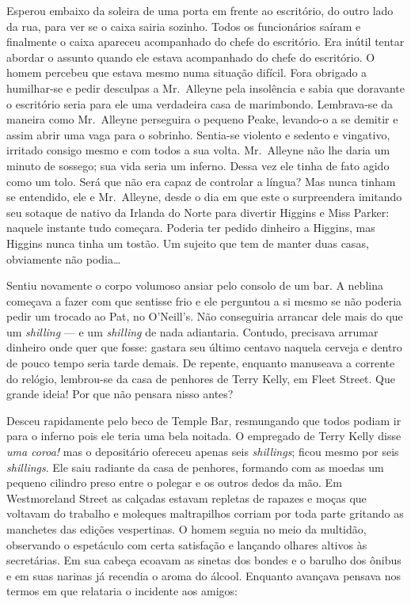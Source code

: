 \smallskip

Esperou embaixo da soleira de uma porta em frente ao escritório, do outro lado
da rua, para ver se o caixa sairia sozinho.  Todos os funcionários saíram e
finalmente o caixa apareceu acompanhado do chefe do escritório.  Era inútil
tentar abordar o assunto quando ele estava acompanhado do chefe do escritório.
O homem percebeu que estava mesmo numa situação difícil.  Fora obrigado a
humilhar-se e pedir desculpas a Mr.~Alleyne pela insolência e sabia que
doravante o escritório seria para ele uma verdadeira casa de marimbondo.
Lembrava-se da maneira como Mr.~Alleyne perseguira o pequeno Peake, levando-o a
se demitir e assim abrir uma vaga para o sobrinho.  Sentia-se violento e
sedento e vingativo, irritado consigo mesmo e com todos a sua volta.  
Mr.~Alleyne não lhe daria um minuto de sossego; sua vida seria um inferno.  Dessa
vez ele tinha de fato agido como um tolo.  Será que não era capaz de controlar
a língua?  Mas nunca tinham se entendido, ele e Mr.~Alleyne, desde o dia em que
este o surpreendera imitando seu sotaque de nativo da Irlanda do Norte para
divertir Higgins e Miss Parker: naquele instante tudo começara.  Poderia ter
pedido dinheiro a Higgins, mas Higgins nunca tinha um tostão.  Um sujeito que
tem de manter duas casas, obviamente não podia\ldots{}

Sentiu novamente o corpo volumoso ansiar pelo consolo de um bar.  A neblina
começava a fazer com que sentisse frio e ele perguntou a si mesmo se não
poderia pedir um trocado ao Pat, no O’Neill’s.  Não conseguiria arrancar dele
mais do que um \textit{shilling} --- e um \textit{shilling} de nada
adiantaria.  Contudo, precisava arrumar dinheiro onde quer que fosse: gastara
seu último centavo naquela cerveja e dentro de pouco tempo seria tarde demais.
De repente, enquanto manuseava a corrente do relógio, lembrou-se da casa de
penhores de Terry Kelly, em Fleet Street.  Que grande ideia!  Por que não
pensara nisso antes?

Desceu rapidamente pelo beco de Temple Bar, resmungando que todos podiam ir
para o inferno pois ele teria uma bela noitada.  O empregado de Terry Kelly
disse \textit{uma coroa!} mas o depositário ofereceu apenas seis
\textit{shillings}; ficou mesmo por seis \textit{shillings}.  Ele saiu radiante
da casa de penhores, formando com as moedas um pequeno cilindro preso entre o
polegar e os outros dedos da mão.  Em Westmoreland Street as calçadas estavam
repletas de rapazes e moças que voltavam do trabalho e moleques maltrapilhos
corriam por toda parte gritando as manchetes das edições vespertinas.  O homem
seguia no meio da multidão, observando o espetáculo com certa satisfação e
lançando olhares altivos às secretárias.  Em sua cabeça ecoavam as sinetas dos
bondes e o barulho dos ônibus e em suas narinas já recendia o aroma do álcool.
Enquanto avançava pensava nos termos em que relataria o incidente aos amigos:

